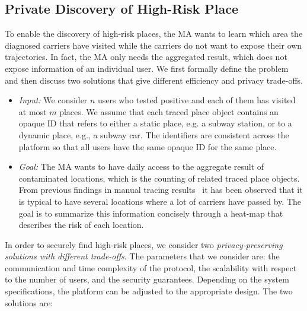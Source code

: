 \documentclass[11pt,dvipdfmx]{article}  %
\begin{document}
\subsection{Private Discovery of High-Risk Place}

To enable the discovery of high-risk places,  the MA wants to learn which area the diagnosed carriers have visited while the  carriers do not want to expose their own trajectories. In fact, the MA only needs the aggregated result, which does not expose information of an individual user. 
We first formally define the problem and then discuss two solutions that give different efficiency and privacy trade-offs.

\begin{itemize}
    \item \emph{Input:} We consider $n$ users who tested positive and each of them has visited at most $m$ places. We assume that each traced place object contains an opaque ID that refers to either a static place, e.g. a subway station, or to a dynamic place, e.g., a subway car. The identifiers are consistent across the platform so that all users have the same opaque ID for the same place.
    \item \emph{Goal:} The MA wants to have daily access to the aggregate result of contaminated locations, which is the counting of related traced place objects. From previous findings in manual tracing results~\cite{fishstore} it has been observed that it is typical to have several locations where a lot of carriers have passed by. The goal is to summarize this information concisely through a heat-map that describes the risk of each location.  %
\end{itemize}

In order to securely find high-risk places, we consider two \emph{privacy-preserving solutions with different trade-offs}.
The parameters that we consider are: the communication and time complexity of the protocol, the scalability with respect to the number of users, and the security guarantees. 
Depending on the system specifications, the platform can be adjusted to the appropriate design. 
The two solutions are:

\end{document}
